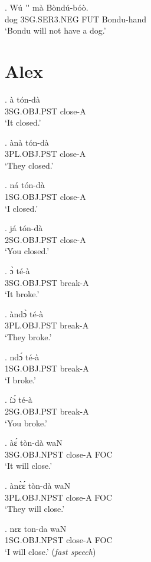 \documentclass{assets/fieldnotes}
\begin{document}
\exg. W\'{u} \'{}\'{} m\`{a} B\`{o}nd\'{u}-b\'{o}\`{o}. \\ 
dog 3SG.SER3.NEG FUT Bondu-hand \\
`Bondu will not have a dog.'  


\section{Alex}


\exg.
à             tón-dà  \\
3SG.OBJ.PST   close-A \\%
`It closed.'

\exg.
ànà           tón-dà  \\
3PL.OBJ.PST   close-A \\%
`They closed.'

\exg.
ná            tón-dà  \\
1SG.OBJ.PST   close-A \\%
`I closed.'

\exg.
já            tón-dà  \\
2SG.OBJ.PST   close-A \\%
`You closed.'

\exg.
ɔ̀             té-à    \\
3SG.OBJ.PST   break-A \\%
`It broke.'

\exg.
àndɔ̀          té-à    \\
3PL.OBJ.PST   break-A \\%
`They broke.'

\exg.
ndɔ́           té-à    \\
1SG.OBJ.PST   break-A \\%
`I broke.'

\exg.
íɔ́            té-à    \\
2SG.OBJ.PST   break-A \\%
`You broke.' \label{44430}

\exg.
àɛ́             tòn-dà    waN \\
3SG.OBJ.NPST   close-A   FOC \\%
`It will close.'

\exg.
ànɛ̀ɛ́           tòn-dà    waN \\
3PL.OBJ.NPST   close-A   FOC \\%
`They will close.'

\exg.
nɛɛ            ton-da    waN \\
1SG.OBJ.NPST   close-A   FOC \\%
`I will close.' (\textit{fast speech})
\end{document}
